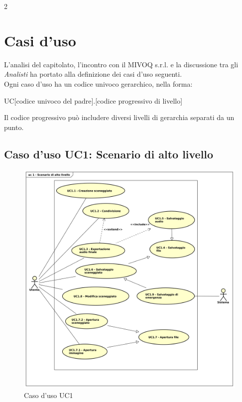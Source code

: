 2\section{Casi d'uso}
L’analisi del capitolato, l’incontro con il MIVOQ s.r.l. e la discussione tra gli \textit{Analisti} ha
portato alla definizione dei casi d’uso seguenti.\\
Ogni caso d’uso ha un codice univoco gerarchico, nella forma:\\
\begin{center}
UC[codice univoco del padre].[codice progressivo di livello]
\end{center}
Il codice progressivo può includere diversi livelli di gerarchia separati da un punto.

\subsection{Caso d'uso UC1: Scenario di alto livello}

\begin{figure}[htbp]
\centering
\includegraphics[scale=0.5]{UseCase_17_03_2016/immagini/uc_1_scenario_alto_livello.png}
\captionsetup{labelfont=bf}
\caption{Caso d'uso UC1}
\end{figure}

